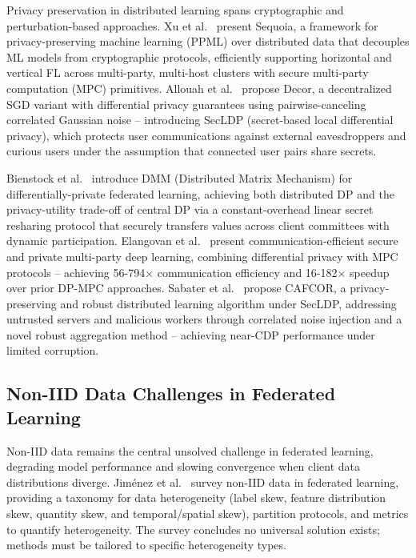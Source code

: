 Privacy preservation in distributed learning spans cryptographic and perturbation-based approaches. Xu et al.\ \cite{Xu25SIGMOD} present Sequoia, a framework for privacy-preserving machine learning (PPML) over distributed data that decouples ML models from cryptographic protocols, efficiently supporting horizontal and vertical FL across multi-party, multi-host clusters with secure multi-party computation (MPC) primitives. Allouah et al.\ \cite{Allouah24ICML} propose Decor, a decentralized SGD variant with differential privacy guarantees using pairwise-canceling correlated Gaussian noise -- introducing SecLDP (secret-based local differential privacy), which protects user communications against external eavesdroppers and curious users under the assumption that connected user pairs share secrets.

Bienstock et al.\ \cite{Bienstock25ICML} introduce DMM (Distributed Matrix Mechanism) for differentially-private federated learning, achieving both distributed DP and the privacy-utility trade-off of central DP via a constant-overhead linear secret resharing protocol that securely transfers values across client committees with dynamic participation. Elangovan et al.\ \cite{Elangovan24IACR} present communication-efficient secure and private multi-party deep learning, combining differential privacy with MPC protocols -- achieving 56-794$\times$ communication efficiency and 16-182$\times$ speedup over prior DP-MPC approaches. Sabater et al.\ \cite{Sabater25ARXIV} propose CAFCOR, a privacy-preserving and robust distributed learning algorithm under SecLDP, addressing untrusted servers and malicious workers through correlated noise injection and a novel robust aggregation method -- achieving near-CDP performance under limited corruption.

\subsection{Non-IID Data Challenges in Federated Learning}
\label{subsec:noniid}

Non-IID data remains the central unsolved challenge in federated learning, degrading model performance and slowing convergence when client data distributions diverge. Jim\'enez et al.\ \cite{Jimenez24ARXIV} survey non-IID data in federated learning, providing a taxonomy for data heterogeneity (label skew, feature distribution skew, quantity skew, and temporal/spatial skew), partition protocols, and metrics to quantify heterogeneity. The survey concludes no universal solution exists; methods must be tailored to specific heterogeneity types.

